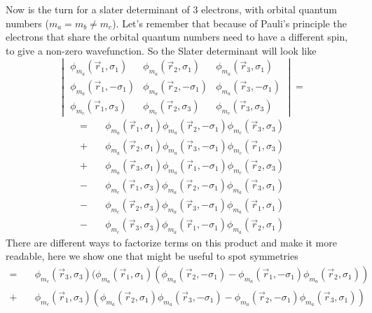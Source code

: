 \begin{questions}
\begin{solution}
Now is the turn for a slater determinant of 3 electrons, with orbital quantum numbers ($m_a = m_b \neq m_c$). Let's remember that because of Pauli's principle the electrons that share the orbital quantum numbers need to have a different spin, to give a non-zero wavefunction. So the Slater determinant will look like
\begin{equation*}
    \begin{vmatrix}
       \phi_{m_a}(\vec{r}_1,\sigma_1) & \phi_{m_a}(\vec{r}_2,\sigma_1) & \phi_{m_a}(\vec{r}_3,\sigma_1)\\
       \phi_{m_a}(\vec{r}_1,-\sigma_1) & \phi_{m_a}(\vec{r}_2,-\sigma_1) &  \phi_{m_a}(\vec{r}_3,-\sigma_1)\\
       \phi_{m_c}(\vec{r}_1,\sigma_3) & \phi_{m_c}(\vec{r}_2,\sigma_3) &  \phi_{m_c}(\vec{r}_3,\sigma_3)
    \end{vmatrix} =
\end{equation*}
\begin{equation*}
  \begin{aligned}
    =\quad &\phi_{m_a}(\vec{r}_1,\sigma_1)\phi_{m_a}(\vec{r}_2,-\sigma_1)\phi_{m_c}(\vec{r}_3,\sigma_3) \\  + & \phi_{m_a}(\vec{r}_2,\sigma_1)\phi_{m_a}(\vec{r}_3,-\sigma_1)\phi_{m_c}(\vec{r}_1,\sigma_3) \\
    + & \phi_{m_a}(\vec{r}_3,\sigma_1)\phi_{m_a}(\vec{r}_1,-\sigma_1)\phi_{m_c}(\vec{r}_2,\sigma_3)\\
    - & \phi_{m_c}(\vec{r}_1,\sigma_3)\phi_{m_a}(\vec{r}_2,-\sigma_1)\phi_{m_a}(\vec{r}_3,\sigma_1) \\
    - & \phi_{m_c}(\vec{r}_2,\sigma_3)\phi_{m_a}(\vec{r}_3,-\sigma_1)\phi_{m_a}(\vec{r}_1,\sigma_1) \\
    - &\phi_{m_c}(\vec{r}_3,\sigma_3)\phi_{m_a}(\vec{r}_1,-\sigma_1)\phi_{m_a}(\vec{r}_2,\sigma_1)
  \end{aligned}
\end{equation*}
There are different ways to factorize terms on this product and make it more readable, here we show one that might be useful to spot symmetries
\begin{equation*}
  \begin{aligned}
    =\quad &\phi_{m_c}(\vec{r}_3,\sigma_3)(\phi_{m_a}(\vec{r}_1,\sigma_1)(\phi_{m_a}(\vec{r}_2,-\sigma_1) - \phi_{m_a}(\vec{r}_1,-\sigma_1)\phi_{m_a}(\vec{r}_2,\sigma_1)) \\  + & \phi_{m_c}(\vec{r}_1,\sigma_3)(\phi_{m_a}(\vec{r}_2,\sigma_1)\phi_{m_a}(\vec{r}_3,-\sigma_1) - \phi_{m_a}(\vec{r}_2,-\sigma_1)\phi_{m_a}(\vec{r}_3,\sigma_1))\\

\end{aligned}
\end{equation*}
\end{solution}
\end{questions}
